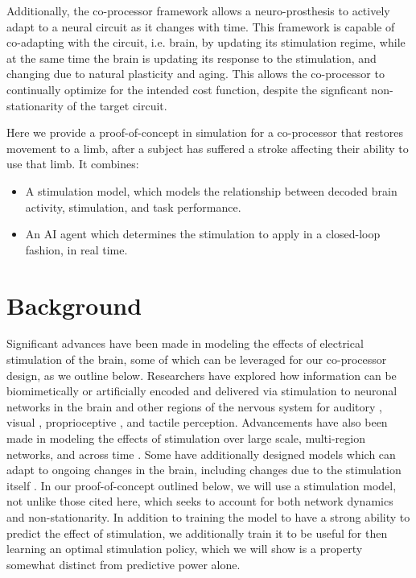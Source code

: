 \documentclass[12pt]{iopart}
\begin{document}
Additionally, the co-processor framework allows a neuro-prosthesis to actively adapt to
a neural circuit as it changes with time. This framework is capable of co-adapting with
the circuit, i.e. brain, by updating its stimulation regime, while at the same time the
brain is updating its response to the stimulation, and changing due to natural plasticity
and aging. This allows the co-processor to continually optimize for the intended cost
function, despite the signficant non-stationarity of the target circuit.

Here we provide a proof-of-concept in simulation for a co-processor that restores
movement to a limb, after a subject has suffered a stroke affecting their ability to
use that limb. It combines:
\begin{itemize}
	\item A stimulation model, which models the relationship between decoded brain activity,
	      stimulation, and task performance.
	\item An AI agent which determines the stimulation to apply in a closed-loop fashion, in real time.
\end{itemize}

\section{Background}
Significant advances have been made in modeling the effects of electrical stimulation
of the brain, some of which can be leveraged for our co-processor design, as we outline
below. Researchers have explored how information can be biomimetically or
artificially encoded and delivered via stimulation to neuronal networks in the brain and
other regions of the nervous system for auditory \cite{niparko.cochlear}, visual \cite{weiland.retinal},
proprioceptive \cite{tomlinson.propr}, and tactile
\cite{tabot.tact, tyler.tact, dadarlat.tact, sharlene.tact, cronin.tact} perception.
Advancements have also been made in modeling the effects of stimulation over large scale, multi-region
networks, and across time \cite{shanechi.stimmodel}. Some have additionally designed models which
can adapt to ongoing changes in the brain, including changes due to the stimulation itself
\cite{tafazoli.acls}. In our proof-of-concept outlined below, we will use a stimulation
model, not unlike those cited here, which seeks to account for both network dynamics
and non-stationarity. In addition to training the model to have a strong ability to predict
the effect of stimulation, we additionally train it to be useful for then learning an
optimal stimulation policy, which we will show is a property somewhat distinct from
predictive power alone.
\end{document}
